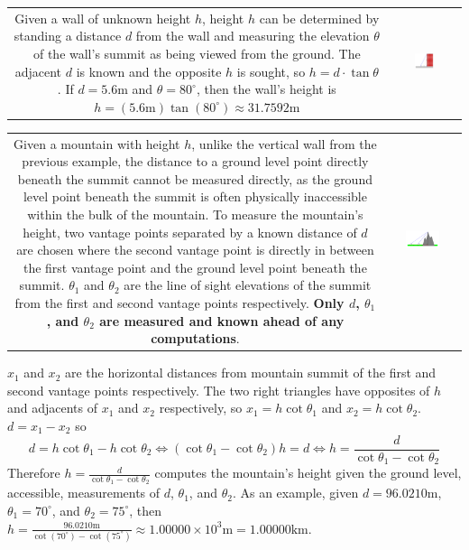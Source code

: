 \documentclass{article}
\begin{document}
\begin{tabular}{cc}
\parbox{0.6\textwidth}{
Given a wall of unknown height \(h\), height \(h\) can be determined by standing a distance \(d\) from the wall and measuring the elevation \(\theta\) of the wall's summit as being viewed from the ground. The adjacent \(d\) is known and the opposite \(h\) is sought, so \(h = d \cdot \tan\theta\). \\
If \(d = 5.6\text{m}\) and \(\theta = 80^\circ\), then the wall's height is \(h = (5.6\text{m})\tan(80^\circ) \approx 31.7592\text{m}\)
} & \parbox{0.3\textwidth}{
\includegraphics[width = 0.3\textwidth]{wall_height}
}
\end{tabular}

\begin{tabular}{cc}
\parbox{0.5\textwidth}{
Given a mountain with height \(h\), unlike the vertical wall from the previous example, the distance to a ground level point directly beneath the summit cannot be measured directly, as the ground level point beneath the summit is often physically inaccessible within the bulk of the mountain. To measure the mountain's height, two vantage points separated by a known distance of \(d\) are chosen where the second vantage point is directly in between the first vantage point and the ground level point beneath the summit. \(\theta_1\) and \(\theta_2\) are the line of sight elevations of the summit from the first and second vantage points respectively. {\bf Only \(d\), \(\theta_1\), and \(\theta_2\) are measured and known ahead of any computations}. 
} & \parbox{0.5\textwidth}{
\includegraphics[width = 0.5\textwidth]{mountain_height}
}
\end{tabular}
\(x_1\) and \(x_2\) are the horizontal distances from mountain summit of the first and second vantage points respectively. The two right triangles have opposites of \(h\) and adjacents of \(x_1\) and \(x_2\)  respectively, so \(x_1 = h\cot\theta_1\) and \(x_2 = h\cot\theta_2\). \(d = x_1 - x_2\) so 
\[d = h\cot\theta_1 - h\cot\theta_2 \iff (\cot\theta_1 - \cot\theta_2)h = d \iff h = \frac{d}{\cot\theta_1 - \cot\theta_2}\]
Therefore \(h = \frac{d}{\cot\theta_1 - \cot\theta_2}\) computes the mountain's height given the ground level, accessible, measurements of \(d\), \(\theta_1\), and \(\theta_2\). As an example, given \(d = 96.0210\text{m}\), \(\theta_1 = 70^\circ\), and \(\theta_2 = 75^\circ\), then \(h = \frac{96.0210\text{m}}{\cot(70^\circ) - \cot(75^\circ)} \approx 1.00000 \times 10^3\text{m} = 1.00000\text{km}\).
\end{document}
